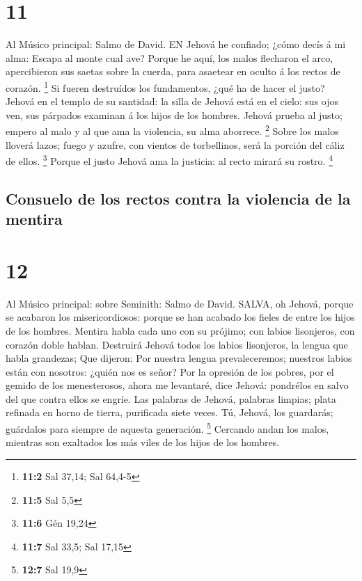 \hypertarget{section-10}{%
\section{11}\label{section-10}}

 Al Músico principal: Salmo de David. EN Jehová he confiado;
¿cómo decís á mi alma: Escapa al monte cual ave?  Porque he
aquí, los malos flecharon el arco, apercibieron sus saetas sobre la
cuerda, para asaetear en oculto á los rectos de corazón. \footnote{\textbf{11:2}
  Sal 37,14; Sal 64,4-5}  Si fueren destruídos los
fundamentos, ¿qué ha de hacer el justo?  Jehová en el templo
de su santidad: la silla de Jehová está en el cielo: sus ojos ven, sus
párpados examinan á los hijos de los hombres.  Jehová prueba
al justo; empero al malo y al que ama la violencia, su alma aborrece.
\footnote{\textbf{11:5} Sal 5,5}  Sobre los malos lloverá
lazos; fuego y azufre, con vientos de torbellinos, será la porción del
cáliz de ellos. \footnote{\textbf{11:6} Gén 19,24}  Porque
el justo Jehová ama la justicia: al recto mirará su rostro. \footnote{\textbf{11:7}
  Sal 33,5; Sal 17,15}

\hypertarget{consuelo-de-los-rectos-contra-la-violencia-de-la-mentira}{%
\subsection{Consuelo de los rectos contra la violencia de la
mentira}\label{consuelo-de-los-rectos-contra-la-violencia-de-la-mentira}}

\hypertarget{section-11}{%
\section{12}\label{section-11}}

 Al Músico principal: sobre Seminith: Salmo de David. SALVA,
oh Jehová, porque se acabaron los misericordiosos: porque se han acabado
los fieles de entre los hijos de los hombres.  Mentira habla
cada uno con su prójimo; con labios lisonjeros, con corazón doble
hablan.  Destruirá Jehová todos los labios lisonjeros, la
lengua que habla grandezas;  Que dijeron: Por nuestra lengua
prevaleceremos; nuestros labios están con nosotros: ¿quién nos es señor?
 Por la opresión de los pobres, por el gemido de los
menesterosos, ahora me levantaré, dice Jehová: pondrélos en salvo del
que contra ellos se engríe.  Las palabras de Jehová,
palabras limpias; plata refinada en horno de tierra, purificada siete
veces.  Tú, Jehová, los guardarás; guárdalos para siempre de
aquesta generación. \footnote{\textbf{12:7} Sal 19,9} 
Cercando andan los malos, mientras son exaltados los más viles de los
hijos de los hombres.

